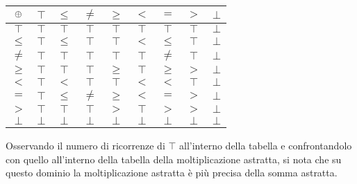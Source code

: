 \begin{center}
        \begin{tabular}{c | c c c c c c c c}
                $\mathbin{\oplus}$ & $\top$ & $\leq$ & $\neq$ & $\geq$ & $<$ & $=$ & $>$ & $\bot$ \\
                \hline
                $\top$ & $\top$ & $\top$ & $\top$ & $\top$ & $\top$ & $\top$ & $\top$ & $\bot$ \\
                $\leq$ & $\top$ & $\leq$ & $\top$ & $\top$ & $<$ & $\leq$ & $\top$ & $\bot$\\
                $\neq$ & $\top$ & $\top$ & $\top$ & $\top$ & $\top$ & $\neq$ & $\top$ & $\bot$ \\
                $\geq$ & $\top$ & $\top$ & $\top$ & $\geq$ & $\top$ & $\geq$ & $>$ & $\bot$\\
                $<$ & $\top$ & $<$ & $\top$ & $\top$ & $<$ & $<$ & $\top$ & $\bot$\\
                $=$ & $\top$ & $\leq$ & $\neq$ & $\geq$ & $<$ & $=$ & $>$ & $\bot$\\
                $>$ & $\top$ & $\top$ & $\top$ & $>$ & $\top$ & $>$ & $>$ & $\bot$ \\
                $\bot$ & $\bot$ & $\bot$ & $\bot$ & $\bot$ & $\bot$ & $\bot$ & $\bot$ & $\bot$
        \end{tabular}
\end{center}

Osservando il numero di ricorrenze di $\top$ all'interno della tabella
e confrontandolo con quello all'interno della tabella
della moltiplicazione astratta, si nota che su questo dominio
la moltiplicazione astratta è più precisa della somma astratta.

